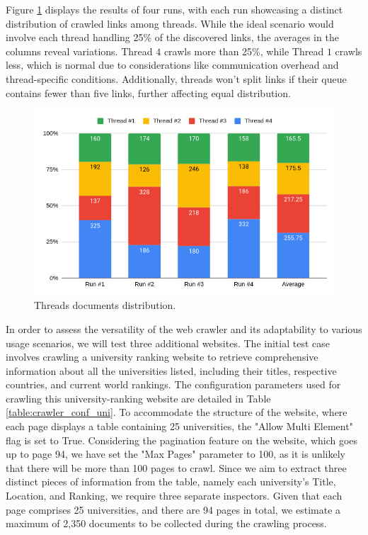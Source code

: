 {Figure \ref{fig:threads-share} displays the results of four runs, with each run showcasing a distinct distribution of crawled links among threads. While the ideal scenario would involve each thread handling 25\% of the discovered links, the averages in the columns reveal variations. Thread $4$ crawls more than 25\%, while Thread $1$ crawls less, which is normal due to considerations like communication overhead and thread-specific conditions. Additionally, threads won't split links if their queue contains fewer than five links, further affecting equal distribution.

\begin{figure}[H]	
     \centering
     \includegraphics[width=13cm]{images/threads_share.png}
     \caption{Threads documents distribution.}
     \label{fig:threads-share}
\end{figure}


In order to assess the versatility of the web crawler and its adaptability to various usage scenarios, we will test three additional websites. The initial test case involves crawling a university ranking website to retrieve comprehensive information about all the universities listed, including their titles, respective countries, and current world rankings. The configuration parameters used for crawling this university-ranking website are detailed in Table \ref{table:crawler_conf_uni}.
To accommodate the structure of the website, where each page displays a table containing 25 universities, the "Allow Multi Element" flag is set to True. Considering the pagination feature on the website, which goes up to page 94, we have set the "Max Pages" parameter to 100, as it is unlikely that there will be more than 100 pages to crawl. Since we aim to extract three distinct pieces of information from the table, namely each university's Title, Location, and Ranking, we require three separate inspectors.
Given that each page comprises 25 universities, and there are 94 pages in total, we estimate a maximum of 2,350 documents to be collected during the crawling process.


}
